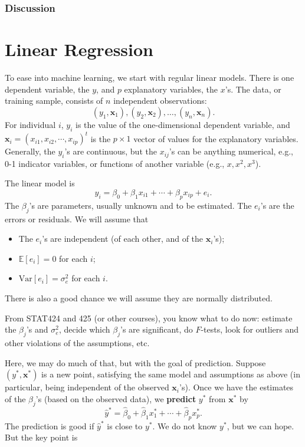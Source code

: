\documentclass[
]{book}
\providecommand{\tightlist}{%
  \setlength{\itemsep}{0pt}\setlength{\parskip}{0pt}}
\begin{document}
\hypertarget{discussion}{%
\subsection{Discussion}\label{discussion}}

\hypertarget{linear-model-chapter}{%
\chapter{Linear Regression}\label{linear-model-chapter}}

To ease into machine learning, we start with regular linear models. There is one dependent variable, the \(y\), and \(p\) explanatory variables, the \(x\)'s. The data, or training sample, consists of \(n\) independent observations:
\[
(y_1,\mathbf{x}_1), (y_2,\mathbf{x}_2),\ldots,(y_n,\mathbf{x}_n).
\]
For individual \(i\), \(y_i\) is the value of the one-dimensional dependent variable, and \(\mathbf{x}_i = (x_{i1}, x_{i2}, \cdots, x_{ip})^t\) is the \(p\times 1\) vector of values for the explanatory variables. Generally, the \(y_i\)'s are continuous, but the \(x_{ij}\)'s can be anything numerical, e.g., 0-1 indicator variables, or functions of another variable (e.g., \(x,x^2,x^3\)).

The linear model is
\begin{equation}
y_i = \beta_0+\beta_1 x_{i1}+\cdots+\beta_p x_{ip}+e_i.
\label{eq:lm3}
\end{equation}
The \(\beta_j\)'s are parameters, usually unknown and to be estimated. The \(e_i\)'s are the errors or residuals. We will assume that

\begin{itemize}
\tightlist
\item
  The \(e_i\)'s are independent (of each other, and of the \(\mathbf{x}_i\)'s);
\item
  \(\mathbb{E} [e_i]=0\) for each \(i\);
\item
  \(\text{Var}[e_i] = \sigma^2_e\) for each \(i\).
\end{itemize}

There is also a good chance we will assume they are normally distributed.

From STAT424 and 425 (or other courses), you know what to do now: estimate the \(\beta_j\)'s and \(\sigma^2_e\), decide which \(\beta_j\)'s are significant, do \(F\)-tests, look for outliers and other violations of the assumptions, etc.

Here, we may do much of that, but with the goal of prediction. Suppose \((y^*,\mathbf{x}^*)\) is a new point, satisfying the same model and assumptions as above (in particular, being independent of the observed \(\mathbf{x}_i\)'s). Once we have the estimates of the \(\beta_j\)'s (based on the observed data), we \textbf{predict} \(y^*\) from \(\mathbf{x}^*\) by
\begin{equation}
\widehat{y}^* = \widehat{\beta}_0+\widehat\beta_1 x^*_1+\cdots+\widehat\beta_p x^{*}_p.
\label{eq:lm4}
\end{equation}
The prediction is good if \(\widehat{y}^{*}\) is close to \(y^{*}\). We do not know \(y^{*}\), but we can hope. But the key point is
\end{document}

